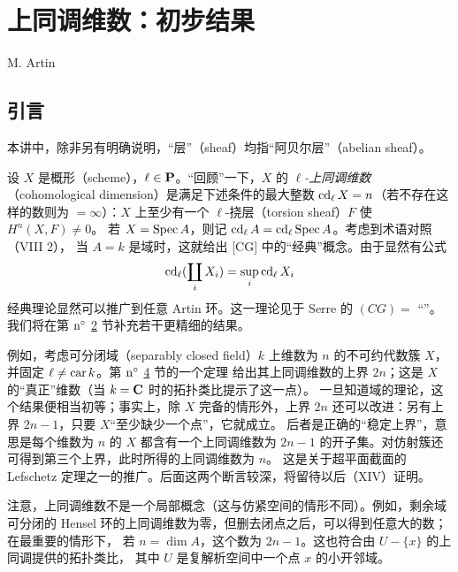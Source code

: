 \chapter{上同调维数：初步结果}
\begin{center}
M. Artin
\end{center}
\label{sga4.exp.X}

\setcounter{pageoriginal}{42}

\section{引言}\pageoriginale

本讲中，除非另有明确说明，“层”（sheaf）均指“阿贝尔层”（abelian sheaf）。

设 $X$ 是概形（scheme），$\ell\in \mathbf{P}$。“回顾”一下，$X$ 的
\emph{$\ell$-上同调维数}（cohomological dimension）是满足下述条件的最大整数
$\operatorname{cd}_{\ell}X=n$（若不存在这样的数则为 $=\infty$）：$X$ 上至少有一个
$\ell$-挠层（torsion sheaf）$F$ 使 $H^n(X,F)\neq 0$。
若 $X=\operatorname{Spec} A$，则记 $\operatorname{cd}_{\ell} A=\operatorname{cd}_{\ell}\operatorname{Spec} A$。考虑到术语对照（VIII 2），%
当 $A=k$ 是域时，这就给出 [CG] 中的“经典”概念。由于显然有公式
$$
\operatorname{cd}_{\ell}(\coprod_i X_i)=\displaystyle{\mathop{\sup}_i} \operatorname{cd}_{\ell}X_i
$$
经典理论显然可以推广到任意 Artin 环。\pageoriginale 这一理论见于 Serre 的
$(CG)=$ “”。%
我们将在第 ${\rm n^{\circ}}$ \hyperref[X.sec2]{2} 节补充若干更精细的结果。

例如，考虑可分闭域（separably closed field）$k$ 上维数为 $n$ 的不可约代数簇
$X$，并固定 $\ell\neq \operatorname{car} k$。第 ${\rm n^{\circ}}$ \hyperref[X.sec4]{4} 节的一个定理
给出其上同调维数的上界 $2n$；这是 $X$ 的“真正”维数（当 $k=\mathbf{C}$ 时的拓扑类比提示了这一点）。
一旦知道域的理论，这个结果便相当初等；事实上，除 $X$ 完备的情形外，上界 $2n$
还可以改进：另有上界 $2n-1$，只要 $X$“至少缺少一个点”，它就成立。
后者是正确的“稳定上界”，意思是每个维数为 $n$ 的 $X$ 都含有一个上同调维数为
$2n-1$ 的开子集。对仿射簇还可得到第三个上界，此时所得的上同调维数为 $n$。
这是关于超平面截面的 Lefschetz 定理之一的推广。后面这两个断言较深，将留待以后（XIV）证明。

注意，上同调维数不是一个局部概念（这与仿紧空间的情形不同）。例如，剩余域可分闭的
Hensel 环的上同调维数为零，但删去闭点之后，可以得到任意大的数；在最重要的情形下，
若 $n=\dim A$，这个数为 $2n-1$。这也符合由 $U-\{x\}$ 的上同调提供的拓扑类比，
其中 $U$ 是复解析空间中一个点 $x$ 的小开邻域。

